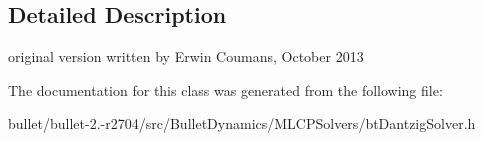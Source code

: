 \subsection{Detailed Description}
original version written by Erwin Coumans, October 2013 

The documentation for this class was generated from the following file\+:\begin{DoxyCompactItemize}
\item 
bullet/bullet-\/2.-\/r2704/src/\+Bullet\+Dynamics/\+M\+L\+C\+P\+Solvers/bt\+Dantzig\+Solver.\+h\end{DoxyCompactItemize}
